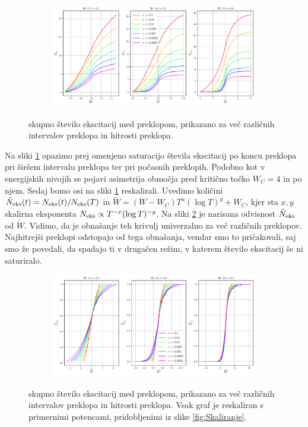 \begin{figure}[!h]
\centering
\begin{subfigure}{.99\textwidth}
\includegraphics[width=\linewidth]{Figures/SkoziCas.pdf}
\end{subfigure}
\caption{skupno število ekscitacij med preklopom, prikazano za več različnih intervalov preklopa in hitrosti preklopa.}
\label{fig:SkoziCas}
\end{figure}
Na sliki \ref{fig:SkoziCas} opazimo prej omenjeno saturacijo števila ekscitacij po koncu preklopa pri širšem intervalu preklopa ter pri počasnih preklopih.
Podobno kot v energijskih nivojih se pojavi asimetrija območja pred kritično točko $W_C=4$ in po njem.
Sedaj bomo osi na sliki \ref{fig:SkoziCas} reskalirali. Uvedimo količini $\tilde{N}_{\textup{eks}}(t) = N_{\textup{eks}}(t)/N_{\textup{eks}}(T)$ in $\tilde{W} = (W-W_C)T^x (\log T)^y+W_C$, kjer sta $x, y$ skalirna eksponenta $N_{\textup{eks}} \propto T^{-x} (\log T)^{-y}$. Na sliki \ref{fig:SkoziCasAlt} je narisana odvisnost $\tilde{N}_{\textup{eks}}$ od $\tilde{W}$. Vidimo, da je obnašanje teh krivulj univerzalno za več različnih preklopov. Najhitrejši preklopi odstopajo od tega obnašanja, vendar smo to pričakovali, saj smo že povedali, da spadajo ti v drugačen režim, v katerem število ekscitacij še ni saturiralo.
\begin{figure}[!h]
\centering
\begin{subfigure}{.99\textwidth}
\includegraphics[width=\linewidth]{Figures/SkoziCasAlt.pdf}
\end{subfigure}
\caption{skupno število ekscitacij med preklopom, prikazano za več različnih intervalov preklopa in hitrosti preklopa. Vsak graf je reskaliran s primernimi potencami, pridobljenimi iz slike \ref{fig:Skaliranje}.}
\label{fig:SkoziCasAlt}
\end{figure}
